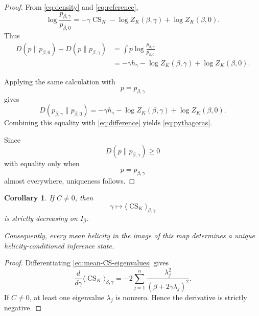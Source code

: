 \documentclass[11pt]{article}
\newtheorem{corollary}[theorem]{Corollary}
\theoremstyle{definition}
\theoremstyle{remark}
\newcommand{\CS}{\operatorname{CS}}
\begin{document}
\begin{proof}
From \eqref{eq:density} and \eqref{eq:reference},
\begin{equation}
\log
\frac{
p_{\beta,\gamma}
}{
p_{\beta,0}
}
=
-\gamma\CS_K
-
\log Z_K(\beta,\gamma)
+
\log Z_K(\beta,0).
\label{eq:ratio}
\end{equation}
Thus
\begin{align}
D(p\|p_{\beta,0})
-
D(p\|p_{\beta,\gamma})
&=
\int
p
\log
\frac{
p_{\beta,\gamma}
}{
p_{\beta,0}
}
\nonumber\\
&=
-\gamma h_\gamma
-
\log Z_K(\beta,\gamma)
+
\log Z_K(\beta,0).
\label{eq:difference}
\end{align}

Applying the same calculation with
\begin{equation}
p=p_{\beta,\gamma}
\end{equation}
gives
\begin{equation}
D(p_{\beta,\gamma}\|p_{\beta,0})
=
-\gamma h_\gamma
-
\log Z_K(\beta,\gamma)
+
\log Z_K(\beta,0).
\end{equation}
Combining this equality with \eqref{eq:difference} yields
\eqref{eq:pythagoras}.

Since
\begin{equation}
D(p\|p_{\beta,\gamma})\geq0
\end{equation}
with equality only when
\begin{equation}
p=p_{\beta,\gamma}
\end{equation}
almost everywhere, uniqueness follows.
\end{proof}

\begin{corollary}
\label{cor:strict}
If \(C\neq0\), then
\begin{equation}
\gamma
\longmapsto
\langle\CS_K\rangle_{\beta,\gamma}
\end{equation}
is strictly decreasing on \(I_\beta\).

Consequently, every mean helicity in the image of this map
determines a unique helicity-conditioned inference state.
\end{corollary}

\begin{proof}
Differentiating \eqref{eq:mean-CS-eigenvalues} gives
\begin{equation}
\frac{d}{d\gamma}
\langle\CS_K\rangle_{\beta,\gamma}
=
-2
\sum_{j=1}^n
\frac{
\lambda_j^2
}{
(\beta+2\gamma\lambda_j)^2
}.
\label{eq:strict-monotonicity}
\end{equation}
If \(C\neq0\), at least one eigenvalue \(\lambda_j\) is
nonzero. Hence the derivative is strictly negative.
\end{proof}
\end{document}
